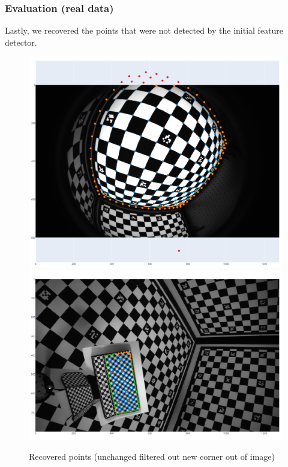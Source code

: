\documentclass{beamer}
\begin{document}
\begin{frame}
	\frametitle{Evaluation (real data)}
	Lastly, we recovered the points that were not detected by the initial feature
	detector.

	\begin{figure}[h]
		\centering
		\includegraphics[width=0.75\linewidth]{refined_corners1.png}
		\includegraphics[width=0.75\linewidth]{refined_corners2.png}

		\caption{Recovered points
			(\textcolor[HTML]{1f77b4}{unchanged}
			\textcolor[HTML]{ff7f0e}{filtered out}
			\textcolor[HTML]{2ca02c}{new corner}
			\textcolor[HTML]{d62728}{out of image})}
		\label{fig:recovered_good_points}
	\end{figure}

\end{frame}
\end{document}
